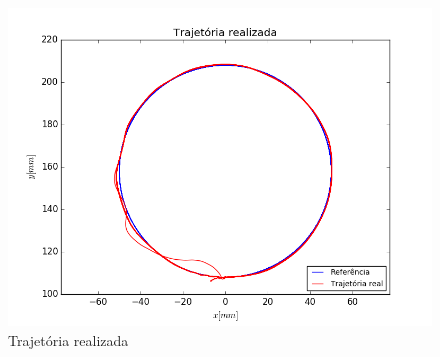 \documentclass[]{politex}
\begin{document}
\begin{figure}[H]
	\centering
	\includegraphics[scale=0.39]{../../../Experimental/Aquisicoes/SMCt_circulo/xy.png}  
	\caption{Trajetória realizada}
	\label{fig:SMCq_circulo_xy}
\end{figure}
\end{document}
